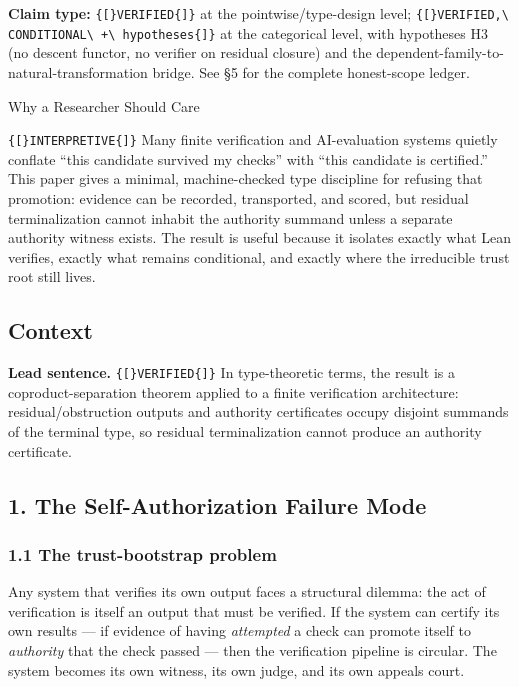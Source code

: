 \documentclass[
  10pt,
]{article}
\DeclareRobustCommand{\texttt}[1]{{\paperSymbolFont\nolinkurl{#1}}}
\begin{document}
\textbf{Claim type:} \texttt{{[}VERIFIED{]}} at the pointwise/type-design level; \texttt{{[}VERIFIED,\ CONDITIONAL\ +\ hypotheses{]}} at the categorical level, with hypotheses H3 (no descent functor, no verifier on residual closure) and the dependent-family-to-natural-transformation bridge. See §5 for the complete honest-scope ledger.

Why a Researcher Should Care

\texttt{{[}INTERPRETIVE{]}} Many finite verification and AI-evaluation systems quietly conflate ``this candidate survived my checks'' with ``this candidate is certified.'' This paper gives a minimal, machine-checked type discipline for refusing that promotion: evidence can be recorded, transported, and scored, but residual terminalization cannot inhabit the authority summand unless a separate authority witness exists. The result is useful because it isolates exactly what Lean verifies, exactly what remains conditional, and exactly where the irreducible trust root still lives.

\subsection{Context}\label{context}

\textbf{Lead sentence.} \texttt{{[}VERIFIED{]}} In type-theoretic terms, the result is a coproduct-separation theorem applied to a finite verification architecture: residual/obstruction outputs and authority certificates occupy disjoint summands of the terminal type, so residual terminalization cannot produce an authority certificate.

\subsection{1. The Self-Authorization Failure Mode}\label{the-self-authorization-failure-mode}

\subsubsection{1.1 The trust-bootstrap problem}\label{the-trust-bootstrap-problem}

Any system that verifies its own output faces a structural dilemma: the act of verification is itself an output that must be verified. If the system can certify its own results --- if evidence of having \emph{attempted} a check can promote itself to \emph{authority} that the check passed --- then the verification pipeline is circular. The system becomes its own witness, its own judge, and its own appeals court.
\end{document}
